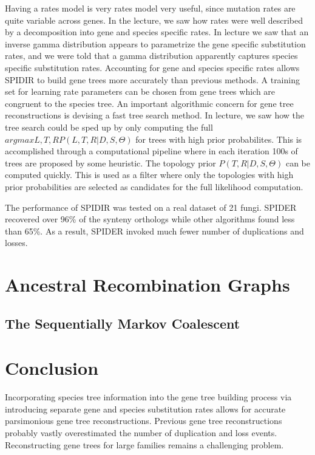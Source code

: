 Having a rates model is very rates model very useful, since mutation
rates are quite variable across genes. In the lecture, we saw how
rates were well described by a decomposition into gene and species
specific rates. In lecture we saw that an inverse gamma distribution
appears to parametrize the gene specific substitution rates, and we
were told that a gamma distribution apparently captures species
specific substitution rates. Accounting for gene and species specific
rates allows SPIDIR to build gene trees more accurately than previous
methods. A training set for learning rate parameters can be chosen
from gene trees which are congruent to the species tree. An important
algorithmic concern for gene tree reconstructions is devising a fast
tree search method. In lecture, we saw how the tree search could be
sped up by only computing the full $argmax L,T,R P(L,T,R|D,S,\Theta)$
for trees with high prior probabilites. This is accomplished through a
computational pipeline where in each iteration 100s of trees are
proposed by some heuristic. The topology prior $P(T,R|D,S,\Theta)$ can
be computed quickly. This is used as a filter where only the
topologies with high prior probabilities are selected as candidates
for the full likelihood computation.

\noindent The performance of SPIDIR was tested on a real dataset of 21
fungi. SPIDER recovered over 96\% of the synteny orthologs while other
algorithms found less than 65\%. As a result, SPIDER invoked much
fewer number of duplications and losses.

\section{Ancestral Recombination Graphs}


\subsection{The Sequentially Markov Coalescent}


\section{Conclusion} 
Incorporating species tree information into the gene tree building
process via introducing separate gene and species substitution rates
allows for accurate parsimonious gene tree reconstructions. Previous
gene tree reconstructions probably vastly overestimated the number of
duplication and loss events. Reconstructing gene trees for large
families remains a challenging problem.

